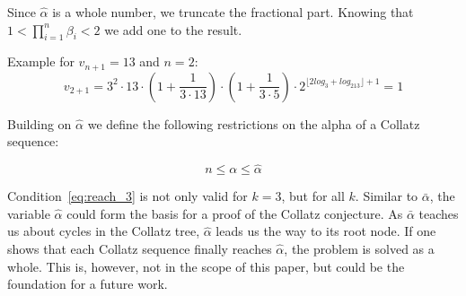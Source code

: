 \par\medskip
Since $\hat\alpha$ is a whole number, we truncate the fractional part. Knowing that $1<\prod_{i=1}^{n}\beta_i<2$ we add one to the result.

\bigskip
\begin{example}
Example for $v_{n+1}=13$ and $n=2$:
\[
v_{2+1}=3^2\cdot13\cdot\left(1+\frac{1}{3\cdot13}\right)\cdot\left(1+\frac{1}{3\cdot5}\right)\cdot2^{\lfloor2log_3+log_213\rfloor+1}=1
\]
\end{example}

Building on $\hat\alpha$ we define the following restrictions on the alpha of a Collatz sequence:

\begin{equation}
\label{eq:reach_3}
n\le\alpha\le\hat\alpha
\end{equation}

Condition~\ref{eq:reach_3} is not only valid for $k=3$, but for all $k$. Similar to $\bar\alpha$, the variable $\hat\alpha$ could form the basis for a proof of the Collatz conjecture. As $\bar\alpha$ teaches us about cycles in the Collatz tree, $\hat\alpha$ leads us the way to its root node. If one shows that each Collatz sequence finally reaches $\hat\alpha$, the problem is solved as a whole. This is, however, not in the scope of this paper, but could be the foundation for a future work.
